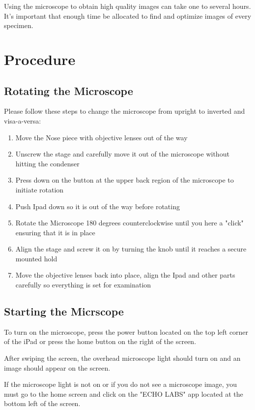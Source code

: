 \documentclass[12pt]{../SOP3_beta}
\begin{document}
\NP Using the microscope to obtain high quality images can take one to several hours. It's important that enough time be allocated to find and optimize images of every specimen. 

\section{Procedure}

\subsection*{Rotating the Microscope}

\NP Please follow these steps to change the microscope from upright to inverted and visa-a-versa:

\begin{enumerate}
  \item Move the Nose piece with objective lenses out of the way
  \item Unscrew the stage and carefully move it out of the microscope without hitting the condenser 
  \item Press down on the button at the upper back region of the microscope to initiate rotation 
  \item Push Ipad down so it is out of the way before rotating
  \item Rotate the Microscope 180 degrees counterclockwise until you here a "click" ensuring that it is in place
  \item Align the stage and screw it on by turning the knob until it reaches a secure mounted hold
  \item Move the objective lenses back into place, align the Ipad and other parts carefully so everything is set for examination
\end{enumerate}

\subsection*{Starting the Micrscope}

\NP To turn on the microscope, press the power button located on the top left corner of the iPad or press the home button on the right of the screen.

\NP After swiping the screen, the overhead microscope light should turn on and an image should appear on the screen.
  
\NP  If the microscope light is not on or if you do not see a microscope image, you must go to the home screen and click on the "ECHO LABS" app located at the bottom left of the screen.
\end{document}

